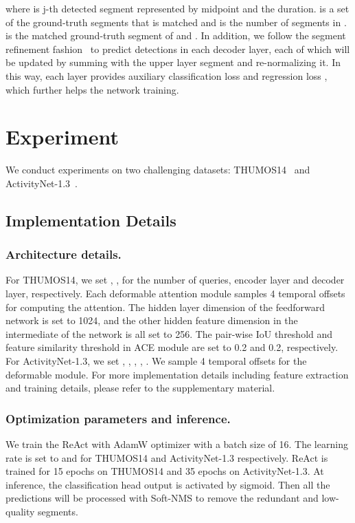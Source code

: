 \documentclass[runningheads]{llncs}
\def\name{ReAct }
\def\cls{ACE }
\begin{document}
where  is j-th detected segment represented by midpoint and the duration.  is a set of the ground-truth segments that  is matched and  is the number of segments in .  is the matched ground-truth segment of  and . In addition, we follow the segment refinement fashion~\cite{zhu2020deformable,liu2021end} to predict detections in each decoder layer, each of which will be updated by summing with the upper layer segment and re-normalizing it. In this way, each layer provides auxiliary classification loss  and regression loss , which  further helps the network training.



\section{Experiment}
We conduct experiments on two challenging datasets: THUMOS14~\cite{THUMOS14} and ActivityNet-1.3~\cite{caba2015activitynet}.



\subsection{Implementation Details} 
\subsubsection{Architecture details.}
For THUMOS14, we set , ,  for the number of queries, encoder layer and decoder layer, respectively. Each deformable attention module samples 4 temporal offsets for computing the attention. The hidden layer dimension of the feedforward network is set to 1024, and the other hidden feature dimension in the intermediate of the network is all set to 256. The pair-wise IoU threshold  and feature similarity threshold  in \cls module are set to 0.2 and 0.2, respectively. 
For ActivityNet-1.3, we set , , , , . We sample 4 temporal offsets for the deformable module. 
For more implementation details including feature extraction and training details, please refer to the supplementary material.


\subsubsection{Optimization parameters and inference.} We train the \name with AdamW optimizer with a batch size of 16. The learning rate is set to  and  for THUMOS14 and ActivityNet-1.3 respectively. \name is trained for 15 epochs on THUMOS14 and 35 epochs on ActivityNet-1.3. At inference, the classification head output is activated by sigmoid. Then all the predictions will be processed with Soft-NMS\cite{bodla2017soft} to remove the redundant and low-quality segments.
\end{document}
